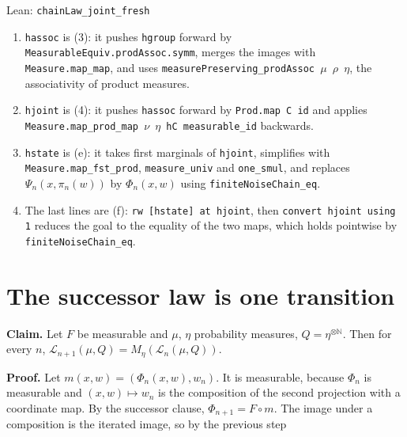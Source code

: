 \documentclass[11pt,a4paper]{article}
\begin{document}
\begin{leanbox}{Lean: \texttt{chainLaw\_\allowbreak{}joint\_\allowbreak{}fresh}}
\begin{enumerate}
\item \texttt{hassoc} is (3): it pushes \texttt{hgroup} forward by \texttt{Measurable\allowbreak{}Equiv.\allowbreak{}prod\allowbreak{}Assoc.\allowbreak{}symm}, merges the images with \texttt{Measure.\allowbreak{}map\_\allowbreak{}map}, and uses \texttt{measure\allowbreak{}Preserving\_\allowbreak{}prod\allowbreak{}Assoc \ensuremath{\mu} \ensuremath{\rho} \ensuremath{\eta}}, the associativity of product measures.

\item \texttt{hjoint} is (4): it pushes \texttt{hassoc} forward by \texttt{Prod.\allowbreak{}map C id} and applies \texttt{Measure.\allowbreak{}map\_\allowbreak{}prod\_\allowbreak{}map \ensuremath{\nu} \ensuremath{\eta} h\allowbreak{}C measurable\_\allowbreak{}id} backwards.

\item \texttt{hstate} is (e): it takes first marginals of \texttt{hjoint}, simplifies with \texttt{Measure.\allowbreak{}map\_\allowbreak{}fst\_\allowbreak{}prod}, \texttt{measure\_\allowbreak{}univ} and \texttt{one\_\allowbreak{}smul}, and replaces \(\Psi_n(x,\pi_n(w))\) by \(\Phi_n(x,w)\) using \texttt{finite\allowbreak{}Noise\allowbreak{}Chain\_\allowbreak{}eq}.

\item The last lines are (f): \texttt{rw [hstate] at hjoint}, then \texttt{convert hjoint using 1} reduces the goal to the equality of the two maps, which holds pointwise by \texttt{finite\allowbreak{}Noise\allowbreak{}Chain\_\allowbreak{}eq}.

\end{enumerate}
\end{leanbox}

\section{\texorpdfstring{The successor law is one transition}{The successor law is one transition}}


\textbf{Claim.} Let \(F\) be measurable and \(\mu\), \(\eta\) probability measures, \(Q=\eta^{\otimes\mathbb N}\). Then for every \(n\), \(\mathcal L_{n+1}(\mu,Q)=M_\eta(\mathcal L_n(\mu,Q))\).




\textbf{Proof.} Let \(m(x,w)=(\Phi_n(x,w),w_n)\). It is measurable, because \(\Phi_n\) is measurable and \((x,w)\mapsto w_n\) is the composition of the second projection with a coordinate map. By the successor clause, \(\Phi_{n+1}=F\circ m\). The image under a composition is the iterated image, so by the previous step
\end{document}
